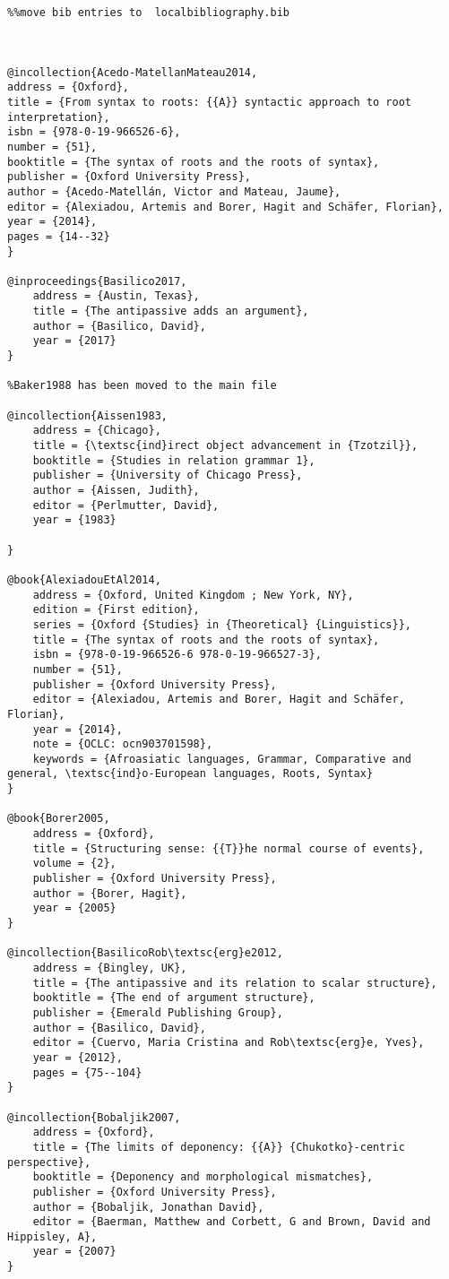 \documentclass[output=paper,modfonts,nonflat,newtxmath]{langsci/langscibook}
\begin{document}
\begin{verbatim}%%move bib entries to  localbibliography.bib



@incollection{Acedo-MatellanMateau2014,
address = {Oxford},
title = {From syntax to roots: {{A}} syntactic approach to root interpretation},
isbn = {978-0-19-966526-6},
number = {51},
booktitle = {The syntax of roots and the roots of syntax},
publisher = {Oxford University Press},
author = {Acedo-Matellán, Victor and Mateau, Jaume},
editor = {Alexiadou, Artemis and Borer, Hagit and Schäfer, Florian},
year = {2014},
pages = {14--32}
}

@inproceedings{Basilico2017,
	address = {Austin, Texas},
	title = {The antipassive adds an argument},
	author = {Basilico, David},
	year = {2017}
}

%Baker1988 has been moved to the main file

@incollection{Aissen1983,
	address = {Chicago},
	title = {\textsc{ind}irect object advancement in {Tzotzil}},
	booktitle = {Studies in relation grammar 1},
	publisher = {University of Chicago Press},
	author = {Aissen, Judith},
	editor = {Perlmutter, David},
	year = {1983}

}

@book{AlexiadouEtAl2014,
	address = {Oxford, United Kingdom ; New York, NY},
	edition = {First edition},
	series = {Oxford {Studies} in {Theoretical} {Linguistics}},
	title = {The syntax of roots and the roots of syntax},
	isbn = {978-0-19-966526-6 978-0-19-966527-3},
	number = {51},
	publisher = {Oxford University Press},
	editor = {Alexiadou, Artemis and Borer, Hagit and Schäfer, Florian},
	year = {2014},
	note = {OCLC: ocn903701598},
	keywords = {Afroasiatic languages, Grammar, Comparative and general, \textsc{ind}o-European languages, Roots, Syntax}
}

@book{Borer2005,
	address = {Oxford},
	title = {Structuring sense: {{T}}he normal course of events},
	volume = {2},
	publisher = {Oxford University Press},
	author = {Borer, Hagit},
	year = {2005}
}

@incollection{BasilicoRob\textsc{erg}e2012,
	address = {Bingley, UK},
	title = {The antipassive and its relation to scalar structure},
	booktitle = {The end of argument structure},
	publisher = {Emerald Publishing Group},
	author = {Basilico, David},
	editor = {Cuervo, Maria Cristina and Rob\textsc{erg}e, Yves},
	year = {2012},
	pages = {75--104}
}

@incollection{Bobaljik2007,
	address = {Oxford},
	title = {The limits of deponency: {{A}} {Chukotko}-centric perspective},
	booktitle = {Deponency and morphological mismatches},
	publisher = {Oxford University Press},
	author = {Bobaljik, Jonathan David},
	editor = {Baerman, Matthew and Corbett, G and Brown, David and Hippisley, A},
	year = {2007}
}


\end{verbatim}
\end{document}
